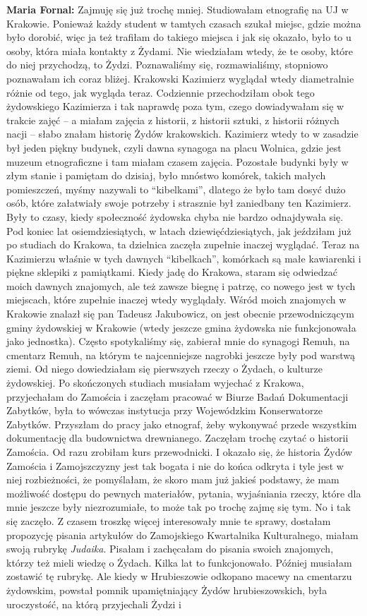 \textbf{Maria Fornal:} Zajmuję się już trochę mniej. Studiowałam etnografię na UJ w Krakowie. Ponieważ każdy student w tamtych czasach szukał miejsc, gdzie można było dorobić, więc ja też trafiłam do takiego miejsca i jak się okazało, było to u osoby, która miała kontakty z Żydami. Nie wiedziałam wtedy, że te osoby, które do niej przychodzą, to Żydzi. Poznawaliśmy się, rozmawialiśmy, stopniowo poznawałam ich coraz bliżej. Krakowski Kazimierz wyglądał wtedy diametralnie różnie od tego, jak wygląda teraz. Codziennie przechodziłam obok tego żydowskiego Kazimierza i tak naprawdę poza tym, czego dowiadywałam się w trakcie zajęć – a miałam zajęcia z historii, z historii sztuki, z historii różnych nacji – słabo znałam historię Żydów krakowskich. Kazimierz wtedy to w zasadzie był jeden piękny budynek, czyli dawna synagoga na placu Wolnica, gdzie jest muzeum etnograficzne i tam miałam czasem zajęcia. Pozostałe budynki były w złym stanie i pamiętam do dzisiaj, było mnóstwo komórek, takich małych pomieszczeń, myśmy nazywali to "`kibelkami"', dlatego że było tam dosyć dużo osób, które załatwiały swoje potrzeby i strasznie był zaniedbany ten Kazimierz. Były to czasy, kiedy społeczność żydowska chyba nie bardzo odnajdywała się. Pod koniec lat osiemdziesiątych, w latach dziewięćdziesiątych, jak jeździłam już po studiach do Krakowa, ta dzielnica zaczęła zupełnie inaczej wyglądać. Teraz na Kazimierzu właśnie w tych dawnych "`kibelkach"', komórkach są małe kawiarenki i piękne sklepiki z pamiątkami. Kiedy jadę do Krakowa, staram się odwiedzać moich dawnych znajomych, ale też zawsze biegnę i patrzę, co nowego jest w tych miejscach, które zupełnie inaczej wtedy wyglądały. Wśród moich znajomych w Krakowie znalazł się pan Tadeusz Jakubowicz, on jest obecnie przewodniczącym gminy żydowskiej w Krakowie (wtedy jeszcze gmina żydowska nie funkcjonowała jako jednostka). Często spotykaliśmy się, zabierał mnie do synagogi Remuh, na cmentarz Remuh, na którym te najcenniejsze nagrobki jeszcze były pod warstwą ziemi. Od niego dowiedziałam się pierwszych rzeczy o Żydach, o kulturze żydowskiej. Po skończonych studiach musiałam wyjechać z Krakowa, przyjechałam do Zamościa i zaczęłam pracować w Biurze Badań Dokumentacji Zabytków, była to wówczas instytucja przy Wojewódzkim Konserwatorze Zabytków. Przyszłam do pracy jako etnograf, żeby wykonywać przede wszystkim dokumentację dla budownictwa drewnianego. Zaczęłam trochę czytać o historii Zamościa. Od razu zrobiłam kurs przewodnicki. I okazało się, że historia Żydów Zamościa i Zamojszczyzny jest tak bogata i nie do końca odkryta i tyle jest w niej rozbieżności, że pomyślałam, że skoro mam już jakieś podstawy, że mam możliwość dostępu do pewnych materiałów, pytania, wyjaśniania rzeczy, które dla mnie jeszcze były niezrozumiałe, to może tak po trochę zajmę się tym. No i tak się zaczęło. Z czasem troszkę więcej interesowały mnie te sprawy, dostałam propozycję pisania artykułów do Zamojskiego Kwartalnika Kulturalnego, miałam swoją rubrykę \textit{Judaika}. Pisałam i zachęcałam do pisania swoich znajomych, którzy też mieli wiedzę o Żydach. Kilka lat to funkcjonowało. Później musiałam zostawić tę rubrykę. Ale kiedy w Hrubieszowie odkopano macewy na cmentarzu żydowskim, powstał pomnik upamiętniający Żydów hrubieszowskich, była uroczystość, na którą przyjechali Żydzi i 